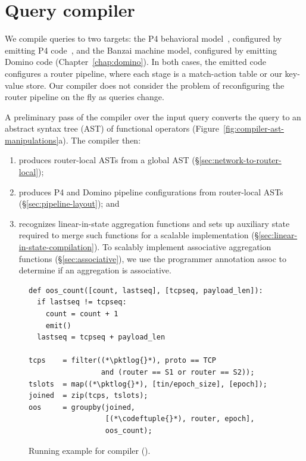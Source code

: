 \section{Query compiler}
\label{sec:compiler}

We compile \TheSystem queries to two targets: the P4 behavioral
model~\cite{p4-bmv2}, configured by emitting P4 code~\cite{p4_16}, and the
Banzai machine model, configured by emitting Domino code
(Chapter~\ref{chap:domino}).  In both cases, the emitted code configures a
router pipeline, where each stage is a match-action table or our key-value
store. Our compiler does not consider the problem of reconfiguring the
router pipeline on the fly as queries change.

A preliminary pass of the compiler over the input query converts the query to
an abstract syntax tree (AST) of functional operators
(Figure~\ref{fig:compiler-ast-manipulations}a). The compiler then:
\begin{enumerate}
\item produces router-local ASTs from a global AST
  (\S\ref{sec:network-to-router-local});
\item produces P4 and Domino pipeline configurations from router-local ASTs
  (\S\ref{sec:pipeline-layout}); and
\item recognizes linear-in-state aggregation functions and sets up
  auxiliary state required to merge such functions for a scalable implementation
  (\S\ref{sec:linear-in-state-compilation}). To scalably implement associative
  aggregation functions (\S\ref{sec:associative}), we use the programmer
  annotation {\ct assoc} to determine if an aggregation is associative.
\end{enumerate}

\begin{figure}[!t]{
\figcodesize
\begin{lstlisting}
def oos_count([count, lastseq], [tcpseq, payload_len]):
  if lastseq != tcpseq:
    count = count + 1
    emit()
  lastseq = tcpseq + payload_len

tcps    = filter((*\pktlog{}*), proto == TCP
                 and (router == S1 or router == S2));
tslots  = map((*\pktlog{}*), [tin/epoch_size], [epoch]);
joined  = zip(tcps, tslots);
oos     = groupby(joined,
                  [(*\codeftuple{}*), router, epoch],
                  oos_count);
\end{lstlisting}
}
\caption{Running example for \TheSystem compiler ().}
\label{fig:running-example-code}
\end{figure}

